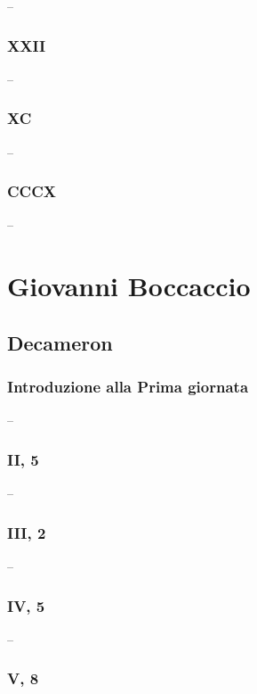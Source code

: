 \documentclass{article}
\begin{document}
--

\newpage
\subsubsection{XXII}

--

\newpage
\subsubsection{XC}

--

\newpage
\subsubsection{CCCX}

--

\newpage
\section{Giovanni Boccaccio}
\subsection{Decameron}
\subsubsection{Introduzione alla Prima giornata}

--

\newpage
\subsubsection{II, 5}

--

\newpage
\subsubsection{III, 2}

--

\newpage
\subsubsection{IV, 5}

--

\newpage
\subsubsection{V, 8}
\end{document}
